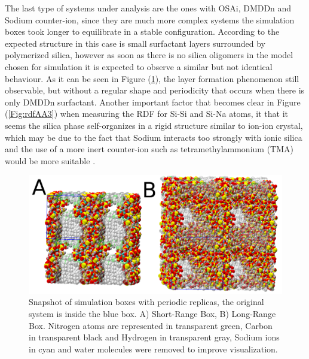 \documentclass[10pt,a4paper,twoside]{article}
\begin{document}
The last type of systems under analysis are the ones with OSAi, DMDDn and Sodium counter-ion, since they are much more complex systems the simulation boxes took longer to equilibrate in a stable configuration. According to  the expected structure in this case is small surfactant layers surrounded by polymerized silica, however as soon as there is no silica oligomers in the model chosen for simulation it is expected to observe a similar but not identical behaviour. As it can be seen in Figure (\ref{Fig:aa3}), the layer formation phenomenon still observable, but without a regular shape and periodicity that occurs when there is only DMDDn surfactant. Another important factor that becomes clear in Figure (\ref{Fig:rdfAA3}) when measuring the RDF for Si-Si and Si-Na atoms, it that it seems the silica phase self-organizes in a rigid structure similar to ion-ion crystal, which may be due to the fact that Sodium interacts too strongly with ionic silica and the use of a more inert counter-ion such as tetramethylammonium (TMA) would be more suitable \cite{mjsilica}.

\begin{figure}[H]
  \begin{center}
	\includegraphics[width=1 \textwidth]{./images/aa3}
	\caption{Snapshot of simulation boxes with periodic replicas, the original system is inside the blue box. A) Short-Range Box, B) Long-Range Box. Nitrogen atoms are represented in transparent green, Carbon in transparent black and Hydrogen in transparent gray, Sodium ions in cyan and water molecules were removed to improve visualization.}
	\label{Fig:aa3}
  \end{center}
\end{figure}
\end{document}
